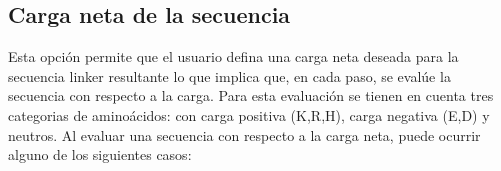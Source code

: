 \subsection{Carga neta de la secuencia}

Esta opción permite que el usuario defina una carga neta deseada para la secuencia linker resultante lo que implica que, en cada paso, se evalúe la secuencia con respecto a la carga. 
Para esta evaluación se tienen en cuenta tres categorias de aminoácidos: con carga positiva (K,R,H), carga negativa (E,D) y neutros.
Al evaluar una secuencia con respecto a la carga neta, puede ocurrir alguno de los siguientes casos:

